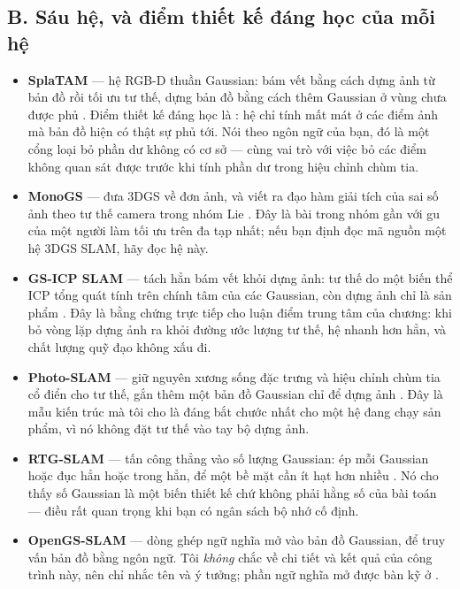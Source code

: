 \documentclass[../../deep_learning.tex]{subfiles}
\begin{document}
\subsection{B. Sáu hệ, và điểm thiết kế đáng học của mỗi hệ}
\begin{itemize}
\item \textbf{SplaTAM} --- hệ RGB-D thuần Gaussian: bám vết bằng cách dựng ảnh từ bản đồ rồi tối ưu tư thế, dựng bản đồ bằng cách thêm Gaussian ở vùng chưa được phủ \cite{f32splatam2024}. Điểm thiết kế đáng học là : hệ chỉ tính mất mát ở các điểm ảnh mà bản đồ hiện có thật sự phủ tới. Nói theo ngôn ngữ của bạn, đó là một cổng loại bỏ phần dư không có cơ sở --- cùng vai trò với việc bỏ các điểm không quan sát được trước khi tính phần dư trong hiệu chỉnh chùm tia.
\item \textbf{MonoGS} --- đưa 3DGS về đơn ảnh, và viết ra đạo hàm giải tích của sai số ảnh theo tư thế camera trong nhóm Lie \cite{f32monogs2024}. Đây là bài trong nhóm gần với gu của một người làm tối ưu trên đa tạp nhất; nếu bạn định đọc mã nguồn một hệ 3DGS SLAM, hãy đọc hệ này.
\item \textbf{GS-ICP SLAM} --- tách hẳn bám vết khỏi dựng ảnh: tư thế do một biến thể ICP tổng quát tính trên chính tâm của các Gaussian, còn dựng ảnh chỉ là sản phẩm \cite{f32gsicp2024}. Đây là bằng chứng trực tiếp cho luận điểm trung tâm của chương: khi bỏ vòng lặp dựng ảnh ra khỏi đường ước lượng tư thế, hệ nhanh hơn hẳn, và chất lượng quỹ đạo không xấu đi.
\item \textbf{Photo-SLAM} --- giữ nguyên xương sống đặc trưng và hiệu chỉnh chùm tia cổ điển cho tư thế, gắn thêm một bản đồ Gaussian chỉ để dựng ảnh \cite{f32photoslam2024}. Đây là mẫu kiến trúc mà tôi cho là đáng bắt chước nhất cho một hệ đang chạy sản phẩm, vì nó không đặt tư thế vào tay bộ dựng ảnh.
\item \textbf{RTG-SLAM} --- tấn công thẳng vào số lượng Gaussian: ép mỗi Gaussian hoặc đục hẳn hoặc trong hẳn, để một bề mặt cần ít hạt hơn nhiều \cite{f32rtgslam2024}. Nó cho thấy số Gaussian là một biến thiết kế chứ không phải hằng số của bài toán --- điều rất quan trọng khi bạn có ngân sách bộ nhớ cố định.
\item \textbf{OpenGS-SLAM} --- dòng ghép ngữ nghĩa mở vào bản đồ Gaussian, để truy vấn bản đồ bằng ngôn ngữ. Tôi \emph{không} chắc về chi tiết và kết quả của công trình này, nên chỉ nhắc tên và ý tưởng; phần ngữ nghĩa mở được bàn kỹ ở .
\end{itemize}
\end{document}
